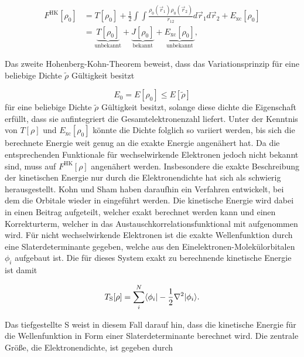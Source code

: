 \begin{equation}
\begin{aligned}
	F^{\textrm{HK}}[\rho_0]&=T[\rho_0]+\frac{1}{2}\int\int \frac{\rho_0(\vec{r}_1)\rho_0(\vec{r}_2)}{r_{12}}d\vec{r}_1d\vec{r}_2+E_{\textrm{xc}}[\rho_0]\\
	&= \underbrace{T[\rho_0]}_{\textrm{unbekannt}} + \underbrace{J[\rho_0]}_{\textrm{bekannt}} + \underbrace{E_{\textrm{xc}}[\rho_0]}_{\textrm{unbekannt}},
\end{aligned}
\end{equation}

Das zweite Hohenberg-Kohn-Theorem beweist, dass das Variationsprinzip für eine beliebige Dichte $\tilde{\rho}$ Gültigkeit besitzt

\begin{equation}
	E_{0}=E[\rho_{0}] \le E[\tilde\rho]
\end{equation}
für eine beliebige Dichte $\tilde{\rho}$ Gültigkeit besitzt, solange diese dichte die Eigenschaft erfüllt, dass sie aufintegriert die Gesamtelektronenzahl liefert. Unter der Kenntnis von $T[\rho]$ und $E_{\textrm{xc}}[\rho_0]$ könnte die Dichte folglich so variiert werden, bis sich die berechnete Energie weit genug an die exakte Energie angenähert hat. Da die entsprechenden Funktionale für wechselwirkende Elektronen jedoch nicht bekannt sind, muss auf $F^{\textrm{HK}}[\rho]$ angenähert werden. Insbesondere die exakte Beschreibung der kinetischen Energie nur durch die Elektronendichte hat sich als schwierig herausgestellt. Kohn und Sham\supercite{kohn1965self} haben daraufhin ein Verfahren entwickelt, bei dem die Orbitale wieder in eingeführt werden. Die kinetische Energie wird dabei in einen Beitrag aufgeteilt, welcher exakt berechnet werden kann und einen Korrekturterm, welcher in das Austauschkorrelationsfunktional mit aufgenommen wird. Für nicht wechselwirkende Elektronen ist die exakte Wellenfunktion durch eine Slaterdeterminante gegeben, welche aus den Einelektronen-Molekülorbitalen $\phi_i$ aufgebaut ist. Die für dieses System exakt zu berechnende kinetische Energie ist damit

\begin{equation}
T_{\textrm S}[\rho] = \sum_i^N\langle\phi_i|-\frac{1}{2}\nabla^2|\phi_i\rangle.
\label{kinenergie}
\end{equation}

Das tiefgestellte S weist in diesem Fall darauf hin, dass die kinetische Energie für die Wellenfunktion in Form einer Slaterdeterminante berechnet wird. Die zentrale Größe, die Elektronendichte, ist gegeben durch

